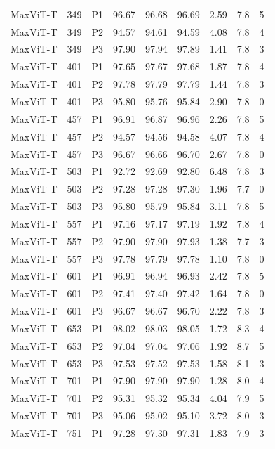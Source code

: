 {\begin{longtable}{lrlrrrrrr}
MaxViT-T & 349 & P1 & 96.67 & 96.68 & 96.69 & 2.59 & 7.8 & 5 \\
MaxViT-T & 349 & P2 & 94.57 & 94.61 & 94.59 & 4.08 & 7.8 & 4 \\
MaxViT-T & 349 & P3 & 97.90 & 97.94 & 97.89 & 1.41 & 7.8 & 3 \\
MaxViT-T & 401 & P1 & 97.65 & 97.67 & 97.68 & 1.87 & 7.8 & 4 \\
MaxViT-T & 401 & P2 & 97.78 & 97.79 & 97.79 & 1.44 & 7.8 & 3 \\
MaxViT-T & 401 & P3 & 95.80 & 95.76 & 95.84 & 2.90 & 7.8 & 0 \\
MaxViT-T & 457 & P1 & 96.91 & 96.87 & 96.96 & 2.26 & 7.8 & 5 \\
MaxViT-T & 457 & P2 & 94.57 & 94.56 & 94.58 & 4.07 & 7.8 & 4 \\
MaxViT-T & 457 & P3 & 96.67 & 96.66 & 96.70 & 2.67 & 7.8 & 0 \\
MaxViT-T & 503 & P1 & 92.72 & 92.69 & 92.80 & 6.48 & 7.8 & 3 \\
MaxViT-T & 503 & P2 & 97.28 & 97.28 & 97.30 & 1.96 & 7.7 & 0 \\
MaxViT-T & 503 & P3 & 95.80 & 95.79 & 95.84 & 3.11 & 7.8 & 5 \\
MaxViT-T & 557 & P1 & 97.16 & 97.17 & 97.19 & 1.92 & 7.8 & 4 \\
MaxViT-T & 557 & P2 & 97.90 & 97.90 & 97.93 & 1.38 & 7.7 & 3 \\
MaxViT-T & 557 & P3 & 97.78 & 97.79 & 97.78 & 1.10 & 7.8 & 0 \\
MaxViT-T & 601 & P1 & 96.91 & 96.94 & 96.93 & 2.42 & 7.8 & 5 \\
MaxViT-T & 601 & P2 & 97.41 & 97.40 & 97.42 & 1.64 & 7.8 & 0 \\
MaxViT-T & 601 & P3 & 96.67 & 96.67 & 96.70 & 2.22 & 7.8 & 3 \\
MaxViT-T & 653 & P1 & 98.02 & 98.03 & 98.05 & 1.72 & 8.3 & 4 \\
MaxViT-T & 653 & P2 & 97.04 & 97.04 & 97.06 & 1.92 & 8.7 & 5 \\
MaxViT-T & 653 & P3 & 97.53 & 97.52 & 97.53 & 1.58 & 8.1 & 3 \\
MaxViT-T & 701 & P1 & 97.90 & 97.90 & 97.90 & 1.28 & 8.0 & 4 \\
MaxViT-T & 701 & P2 & 95.31 & 95.32 & 95.34 & 4.04 & 7.9 & 5 \\
MaxViT-T & 701 & P3 & 95.06 & 95.02 & 95.10 & 3.72 & 8.0 & 3 \\
MaxViT-T & 751 & P1 & 97.28 & 97.30 & 97.31 & 1.83 & 7.9 & 3 \\

\end{longtable}}
